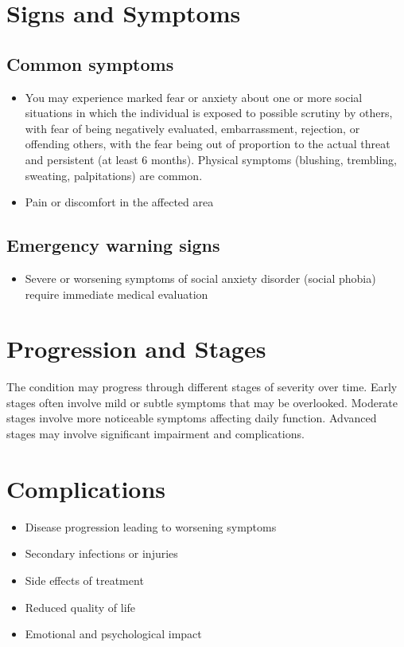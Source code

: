\section{Signs and Symptoms}
\subsection{Common symptoms}
\begin{itemize}[noitemsep]
  \item You may experience marked fear or anxiety about one or more social situations in which the individual is exposed to possible scrutiny by others, with fear of being negatively evaluated, embarrassment, rejection, or offending others, with the fear being out of proportion to the actual threat and persistent (at least 6 months). Physical symptoms (blushing, trembling, sweating, palpitations) are common.
  \item Pain or discomfort in the affected area
  \end{itemize}
\subsection{Emergency warning signs}
\begin{itemize}[noitemsep]
  \item Severe or worsening symptoms of social anxiety disorder (social phobia) require immediate medical evaluation
\end{itemize}
\section{Progression and Stages}
The condition may progress through different stages of severity over time. Early stages often involve mild or subtle symptoms that may be overlooked. Moderate stages involve more noticeable symptoms affecting daily function. Advanced stages may involve significant impairment and complications.
\section{Complications}
\begin{itemize}[noitemsep]
  \item Disease progression leading to worsening symptoms
  \item Secondary infections or injuries
  \item Side effects of treatment
  \item Reduced quality of life
  \item Emotional and psychological impact
\end{itemize}
